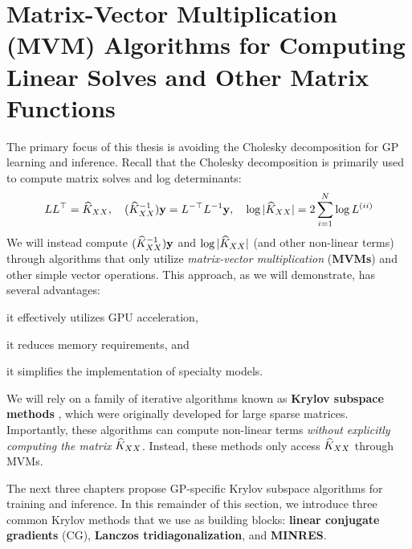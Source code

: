 \section{Matrix-Vector Multiplication (MVM) Algorithms for Computing Linear Solves and Other Matrix Functions}
\label{sec:mvms}

The primary focus of this thesis is avoiding the Cholesky decomposition for GP learning and inference.
Recall that the Cholesky decomposition is primarily used to compute matrix solves and log determinants:
\[
  L L^\top = \widehat{K}_{XX}, \quad
  (\widehat{K}_{XX}^{-1}) \mathbf{y} = L^{-\top} L^{-1} \mathbf{y}, \quad
  \log \vert \widehat{K}_{XX} \vert = 2 \sum_{i=1}^N \log L^{(ii)}
\]
We will instead compute $(\widehat{K}_{XX}^{-1}) \mathbf{y}$ and $\log \vert \widehat{K}_{XX} \vert$ (and other non-linear terms) through algorithms that only utilize \emph{matrix-vector multiplication} ({\bf MVMs}) and other simple vector operations.
This approach, as we will demonstrate, has several advantages:
%
\begin{enumerate*}
  \item it effectively utilizes GPU acceleration,
  \item it reduces memory requirements, and
  \item it simplifies the implementation of specialty models.
\end{enumerate*}
%
We will rely on a family of iterative algorithms known as {\bf Krylov subspace methods} \citep[e.g.][]{saad2003iterative,van2003iterative}, which were originally developed for large sparse matrices.
Importantly, these algorithms can compute non-linear terms \emph{without explicitly computing the matrix} $\widehat{K}_{XX}$.
Instead, these methods only access $\widehat{K}_{XX}$ through MVMs.

The next three chapters propose GP-specific Krylov subspace algorithms for training and inference.
In this remainder of this section, we introduce three common Krylov methods that we use as building blocks: {\bf linear conjugate gradients} (CG), {\bf Lanczos tridiagonalization}, and {\bf MINRES}.

